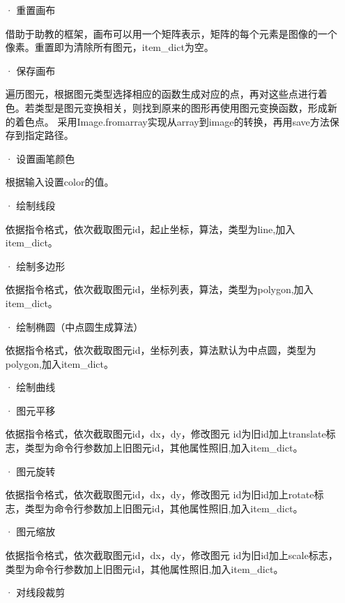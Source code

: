 \documentclass[a4paper,UTF8]{article}
\theoremstyle{definition}
\begin{document}
\begin{itemize}
  \item [·]
  重置画布

  借助于助教的框架，画布可以用一个矩阵表示，矩阵的每个元素是图像的一个像素。重置即为清除所有图元，item\_dict为空。
  
  \item [·]
  保存画布
  
  遍历图元，根据图元类型选择相应的函数生成对应的点，再对这些点进行着色。若类型是图元变换相关，则找到原来的图形再使用图元变换函数，形成新的着色点。
  采用Image.fromarray实现从array到image的转换，再用save方法保存到指定路径。

  \item [·]
  设置画笔颜色

  根据输入设置color的值。

  \item [·]
  绘制线段

  依据指令格式，依次截取图元id，起止坐标，算法，类型为line,加入item\_dict。

  \item [·]
  绘制多边形

  依据指令格式，依次截取图元id，坐标列表，算法，类型为polygon,加入item\_dict。
  
  \item [·]
  绘制椭圆（中点圆生成算法）
  
  依据指令格式，依次截取图元id，坐标列表，算法默认为中点圆，类型为polygon,加入item\_dict。

  \item [·]
  绘制曲线
  
  \item [·]
  图元平移

  依据指令格式，依次截取图元id，dx，dy，修改图元
  id为旧id加上translate标志，类型为命令行参数加上旧图元id，其他属性照旧,加入item\_dict。
  
  \item [·]
  图元旋转

  依据指令格式，依次截取图元id，dx，dy，修改图元
  id为旧id加上rotate标志，类型为命令行参数加上旧图元id，其他属性照旧,加入item\_dict。
  
  \item [·]
  图元缩放

  依据指令格式，依次截取图元id，dx，dy，修改图元
  id为旧id加上scale标志，类型为命令行参数加上旧图元id，其他属性照旧,加入item\_dict。

  \item [·]
  对线段裁剪
  
\end{itemize}
\end{document}
